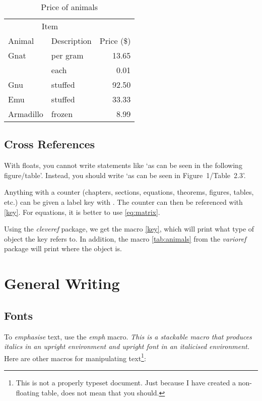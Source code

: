 \documentclass[a4paper]{memoir}
\begin{document}
\begin{table}[p]
    \centering
    \begin{tabular}{llr}
        \toprule
        \multicolumn{2}{c}{Item} &            \\
        \cmidrule(r){1-2}
        Animal    & Description  & Price (\$) \\
        \midrule
        Gnat      & per gram     & 13.65      \\
                  & each         & 0.01       \\
        Gnu       & stuffed      & 92.50      \\
        Emu       & stuffed      & 33.33      \\
        Armadillo & frozen       & 8.99       \\
        \bottomrule
    \end{tabular}
    \caption{Price of animals}
    \label{tab:animals}
\end{table}


\section{Cross References}
With floats, you cannot write statements like `as can be seen in the following figure/table'. Instead, you should write `as can be seen in Figure~1/Table~2.3'.

Anything with a counter (chapters, sections, equations, theorems, figures, tables, etc.) can be given a label key with \label{key}. The counter can then be referenced with \ref{key}. For equations, it is better to use \eqref{eq:matrix}.

Using the \emph{cleveref} package, we get the macro \cref{key}, which will print what type of object the key refers to. In addition, the macro \vref{tab:animals} from the \emph{varioref} package will print where the object is.



\chapter{General Writing}


\section{Fonts}
To \emph{emphasise} text, use the \emph{emph} macro. \emph{This is a stackable macro that produces italics in an \emph{upright} environment and \emph{upright} font in an italicised environment.} Here are other macros for manipulating text\footnote{This is not a properly typeset document. Just because I have created a non-floating table, does not mean that you should.}:
\end{document}
